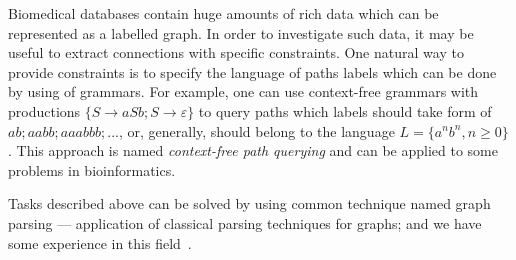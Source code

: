 \documentclass[a0paper,portrait]{baposter}
\begin{document}
\begin{poster}
{Biomedical databases contain huge amounts of rich data which can be represented as a labelled graph.
In order to investigate such data, it may be useful to extract connections with specific constraints.
One natural way to provide constraints is to specify the language of paths labels which can be done by using of grammars.
For example, one can use context-free grammars with productions $\{S \rightarrow a S b; S \rightarrow \varepsilon \}$ to query paths which labels should take form of $ab; aabb; aaabbb; ...$, or, generally, should belong to the language $L = \{a^n b^n, n \geq 0\}$.
This approach is named \emph{context-free path querying} and can be applied to some problems in bioinformatics.


Tasks described above can be solved by using common technique named graph parsing --- application of classical parsing techniques for graphs; and we have some experience in this field~\cite{GraphGLL, RelaxedRNGLR}.

}

    

\end{poster}
\end{document}
